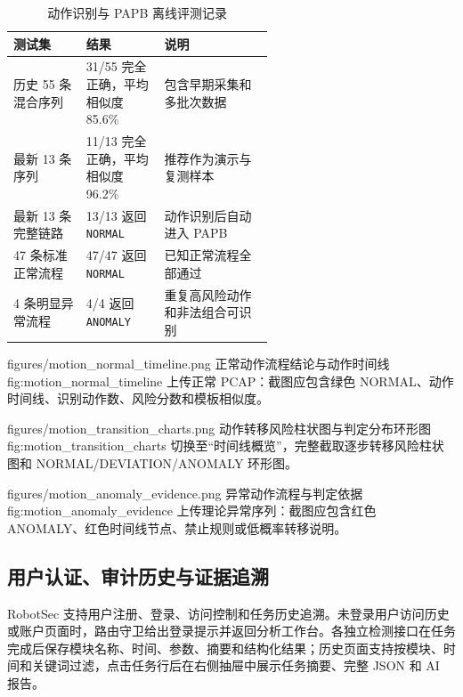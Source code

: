 \begin{table}[H]
\centering
\caption{动作识别与 PAPB 离线评测记录}
\label{tab:motion_offline_result}
\small
\begin{tabularx}{\linewidth}{p{0.28\linewidth}p{0.30\linewidth}X}
\toprule
\textbf{测试集} & \textbf{结果} & \textbf{说明} \\
\midrule
历史 55 条混合序列 & 31/55 完全正确，平均相似度 85.6\% & 包含早期采集和多批次数据 \\
最新 13 条序列 & 11/13 完全正确，平均相似度 96.2\% & 推荐作为演示与复测样本 \\
最新 13 条完整链路 & 13/13 返回 \texttt{NORMAL} & 动作识别后自动进入 PAPB \\
47 条标准正常流程 & 47/47 返回 \texttt{NORMAL} & 已知正常流程全部通过 \\
4 条明显异常流程 & 4/4 返回 \texttt{ANOMALY} & 重复高风险动作和非法组合可识别 \\
\bottomrule
\end{tabularx}
\end{table}

\RobotSecFigure
  {figures/motion_normal_timeline.png}
  {正常动作流程结论与动作时间线}
  {fig:motion_normal_timeline}
  {上传正常 PCAP：截图应包含绿色 NORMAL、动作时间线、识别动作数、风险分数和模板相似度。}

\RobotSecFigure
  {figures/motion_transition_charts.png}
  {动作转移风险柱状图与判定分布环形图}
  {fig:motion_transition_charts}
  {切换至“时间线概览”，完整截取逐步转移风险柱状图和 NORMAL/DEVIATION/ANOMALY 环形图。}

\RobotSecFigure
  {figures/motion_anomaly_evidence.png}
  {异常动作流程与判定依据}
  {fig:motion_anomaly_evidence}
  {上传理论异常序列：截图应包含红色 ANOMALY、红色时间线节点、禁止规则或低概率转移说明。}

\subsection{用户认证、审计历史与证据追溯}
\label{subsec:audit_history}

RobotSec 支持用户注册、登录、访问控制和任务历史追溯。未登录用户访问历史或账户页面时，路由守卫给出登录提示并返回分析工作台。各独立检测接口在任务完成后保存模块名称、时间、参数、摘要和结构化结果；历史页面支持按模块、时间和关键词过滤，点击任务行后在右侧抽屉中展示任务摘要、完整 JSON 和 AI 报告。

